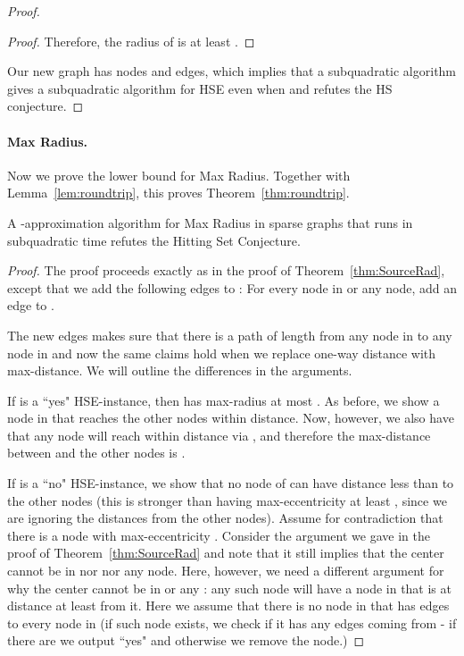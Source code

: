 \begin{proof}
\begin{proof}
Therefore, the radius of  is at least .
\end{proof}

Our new graph  has  nodes and  edges, which implies that a subquadratic  algorithm gives a subquadratic algorithm for HSE even when  and refutes the HS conjecture.
\end{proof}

\paragraph{Max Radius.} Now we prove the lower bound for Max Radius. Together with Lemma~\ref{lem:roundtrip}, this proves Theorem~\ref{thm:roundtrip}.

\begin{lemma}
\label{lem:max}
A -approximation algorithm for Max Radius in sparse graphs that runs in subquadratic time refutes the Hitting Set Conjecture.
\end{lemma}

\begin{proof}
The proof proceeds exactly as in the proof of Theorem~\ref{thm:SourceRad}, except that we add the following edges to :
For every node in  or any  node, add an edge to .

The new edges makes sure that there is a path of length  from any node in  to any node in  and now the same claims hold when we replace one-way distance with max-distance. 
We will outline the differences in the arguments.

If  is a ``yes" HSE-instance, then  has max-radius at most . 
As before, we show a node  in  that reaches the other nodes within  distance.
Now, however, we also have that any node will reach  within distance  via , and therefore the max-distance between  and the other nodes is .

If  is a ``no" HSE-instance, we show that no node of  can have distance less than  to the other nodes (this is stronger than having max-eccentricity at least , since we are ignoring the distances from the other nodes).
Assume for contradiction that there is a node with max-eccentricity .
Consider the argument we gave in the proof of Theorem~\ref{thm:SourceRad} and note that it still implies that the center cannot be in  nor  nor any  node.
Here, however, we need a different argument for why the center cannot be in  or any :
any such node will have a node in  that is at distance at least  from it. 
Here we assume that there is no node in  that has edges to every node in  (if such node exists, we check if it has any edges coming from  - if there are we output ``yes" and otherwise we remove the node.)
\end{proof}


